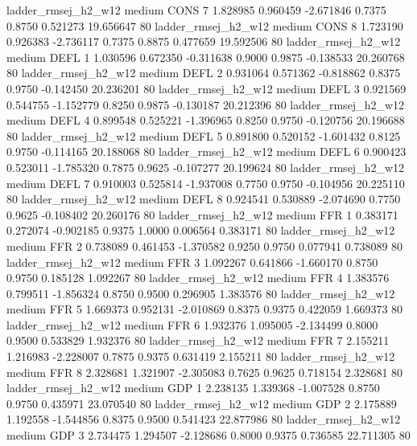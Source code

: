   ladder_rmsej_h2_w12     medium     CONS                 7  1.828985 0.960459 -2.671846 0.7375 0.8750  0.521273   19.656647 80
   ladder_rmsej_h2_w12     medium     CONS                 8  1.723190 0.926383 -2.736117 0.7375 0.8875  0.477659   19.592506 80
   ladder_rmsej_h2_w12     medium     DEFL                 1  1.030596 0.672350 -0.311638 0.9000 0.9875 -0.138533   20.260768 80
   ladder_rmsej_h2_w12     medium     DEFL                 2  0.931064 0.571362 -0.818862 0.8375 0.9750 -0.142450   20.236201 80
   ladder_rmsej_h2_w12     medium     DEFL                 3  0.921569 0.544755 -1.152779 0.8250 0.9875 -0.130187   20.212396 80
   ladder_rmsej_h2_w12     medium     DEFL                 4  0.899548 0.525221 -1.396965 0.8250 0.9750 -0.120756   20.196688 80
   ladder_rmsej_h2_w12     medium     DEFL                 5  0.891800 0.520152 -1.601432 0.8125 0.9750 -0.114165   20.188068 80
   ladder_rmsej_h2_w12     medium     DEFL                 6  0.900423 0.523011 -1.785320 0.7875 0.9625 -0.107277   20.199624 80
   ladder_rmsej_h2_w12     medium     DEFL                 7  0.910003 0.525814 -1.937008 0.7750 0.9750 -0.104956   20.225110 80
   ladder_rmsej_h2_w12     medium     DEFL                 8  0.924541 0.530889 -2.074690 0.7750 0.9625 -0.108402   20.260176 80
   ladder_rmsej_h2_w12     medium      FFR                 1  0.383171 0.272074 -0.902185 0.9375 1.0000  0.006564    0.383171 80
   ladder_rmsej_h2_w12     medium      FFR                 2  0.738089 0.461453 -1.370582 0.9250 0.9750  0.077941    0.738089 80
   ladder_rmsej_h2_w12     medium      FFR                 3  1.092267 0.641866 -1.660170 0.8750 0.9750  0.185128    1.092267 80
   ladder_rmsej_h2_w12     medium      FFR                 4  1.383576 0.799511 -1.856324 0.8750 0.9500  0.296905    1.383576 80
   ladder_rmsej_h2_w12     medium      FFR                 5  1.669373 0.952131 -2.010869 0.8375 0.9375  0.422059    1.669373 80
   ladder_rmsej_h2_w12     medium      FFR                 6  1.932376 1.095005 -2.134499 0.8000 0.9500  0.533829    1.932376 80
   ladder_rmsej_h2_w12     medium      FFR                 7  2.155211 1.216983 -2.228007 0.7875 0.9375  0.631419    2.155211 80
   ladder_rmsej_h2_w12     medium      FFR                 8  2.328681 1.321907 -2.305083 0.7625 0.9625  0.718154    2.328681 80
   ladder_rmsej_h2_w12     medium      GDP                 1  2.238135 1.339368 -1.007528 0.8750 0.9750  0.435971   23.070540 80
   ladder_rmsej_h2_w12     medium      GDP                 2  2.175889 1.192558 -1.544856 0.8375 0.9500  0.541423   22.877986 80
   ladder_rmsej_h2_w12     medium      GDP                 3  2.734475 1.294507 -2.128686 0.8000 0.9375  0.736585   22.711305 80
